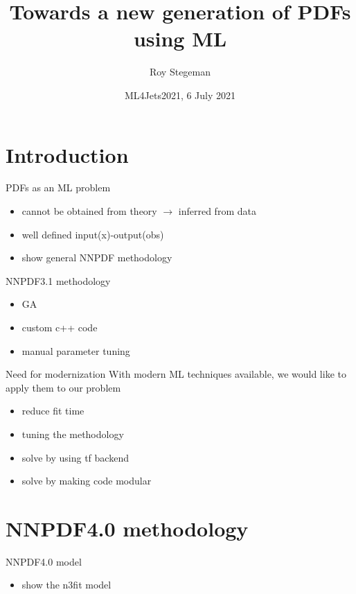 \documentclass[aspectratio=169]{beamer}
\title{Towards a new generation of PDFs using ML}
\date{ML4Jets2021, 6 July 2021}
\author{Roy Stegeman}
\institute{University of Milan and INFN Milan}
\begin{document}
{
\begin{frame}
  \titlepage
\end{frame}
}


\section{Introduction}


\begin{frame}{PDFs as an ML problem}
    \begin{itemize}
        \item cannot be obtained from theory $\rightarrow$ inferred from data
        \item well defined input(x)-output(obs)
        \item show general NNPDF methodology
    \end{itemize}
\end{frame}


\begin{frame}{NNPDF3.1 methodology}
    \begin{itemize}
        \item GA
        \item custom c++ code
        \item manual parameter tuning
    \end{itemize}
\end{frame}



\begin{frame}{Need for modernization}
With modern ML techniques available, we would like to apply them to our problem
    \begin{itemize}
        \item reduce fit time
        \item tuning the methodology
        \item solve by using tf backend
        \item solve by making code modular
    \end{itemize}
\end{frame}


\section{NNPDF4.0 methodology}

\begin{frame}{NNPDF4.0 model}
    \begin{itemize}
        \item show the n3fit model
    \end{itemize}
\end{frame}
\end{document}
